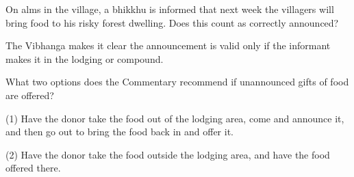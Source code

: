 \bigskip

On alms in the village, a bhikkhu is informed that next week the villagers will
bring food to his risky forest dwelling. Does this count as correctly announced?

\begin{solution}
  The Vibhanga makes it clear the announcement is valid only if the informant
  makes it in the lodging or compound.
\end{solution}

\bigskip

What two options does the Commentary recommend if unannounced gifts of food are offered?

\begin{solution}
  (1) Have the donor take the food out of the lodging area, come and announce it,
  and then go out to bring the food back in and offer it.
 
  (2) Have the donor take the food outside the lodging area, and have the food
  offered there.
\end{solution}

